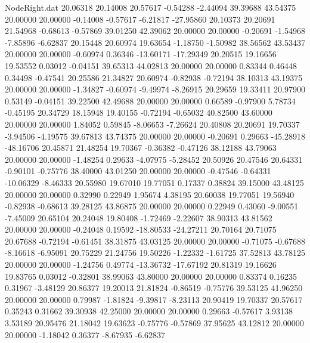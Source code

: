 \begin{filecontents}{NodeRight.dat}
  20.06318   20.14008   20.57617    -0.54288   -2.44094   39.39688   43.54375   20.00000   20.00000   -0.14008   -0.57617   -6.21817  -27.95860
  20.10373   20.20691   21.54968    -0.68613   -0.57869   39.01250   42.39062   20.00000   20.00000   -0.20691   -1.54968   -7.85896   -6.62837
  20.15448   20.60974   19.63654    -1.18750   -1.50982   38.56562   43.53437   20.00000   20.00000   -0.60974    0.36346  -13.60171  -17.29349
  20.20515   19.16656   19.53552     0.03012   -0.04151   39.65313   44.02813   20.00000   20.00000    0.83344    0.46448    0.34498   -0.47541
  20.25586   21.34827   20.60974    -0.82938   -0.72194   38.10313   43.19375   20.00000   20.00000   -1.34827   -0.60974   -9.49974   -8.26915
  20.29659   19.33411   20.97900     0.53149   -0.04151   39.22500   42.49688   20.00000   20.00000    0.66589   -0.97900    5.78734   -0.45195
  20.34729   18.15948   19.40155    -0.72194   -0.65032   40.82500   43.60000   20.00000   20.00000    1.84052    0.59845   -8.06653   -7.26624
  20.40808   20.20691   19.70337    -3.94506   -4.19575   39.67813   43.74375   20.00000   20.00000   -0.20691    0.29663  -45.28918  -48.16706
  20.45871   21.48254   19.70367    -0.36382   -0.47126   38.12188   43.79063   20.00000   20.00000   -1.48254    0.29633   -4.07975   -5.28452
  20.50926   20.47546   20.64331    -0.90101   -0.75776   38.40000   43.01250   20.00000   20.00000   -0.47546   -0.64331  -10.06329   -8.46333
  20.55980   19.67010   19.77051     0.17337    0.38824   39.15000   43.48125   20.00000   20.00000    0.32990    0.22949    1.95674    4.38195
  20.60038   19.77051   19.56940    -0.82938   -0.68613   39.28125   43.86875   20.00000   20.00000    0.22949    0.43060   -9.00551   -7.45009
  20.65104   20.24048   19.80408    -1.72469   -2.22607   38.90313   43.81562   20.00000   20.00000   -0.24048    0.19592  -18.80533  -24.27211
  20.70164   20.71075   20.67688    -0.72194   -0.61451   38.31875   43.03125   20.00000   20.00000   -0.71075   -0.67688   -8.16618   -6.95091
  20.75229   21.24756   19.50226    -1.22332   -1.61725   37.52813   43.78125   20.00000   20.00000   -1.24756    0.49774  -13.36732  -17.67192
  20.81319   19.16626   19.83765     0.03012   -0.32801   38.99063   43.80000   20.00000   20.00000    0.83374    0.16235    0.31967   -3.48129
  20.86377   19.20013   21.81824    -0.86519   -0.75776   39.53125   41.96250   20.00000   20.00000    0.79987   -1.81824   -9.39817   -8.23113
  20.90419   19.70337   20.57617     0.35243    0.31662   39.30938   42.25000   20.00000   20.00000    0.29663   -0.57617    3.93138    3.53189
  20.95476   21.18042   19.63623    -0.75776   -0.57869   37.95625   43.12812   20.00000   20.00000   -1.18042    0.36377   -8.67935   -6.62837

\end{filecontents}
